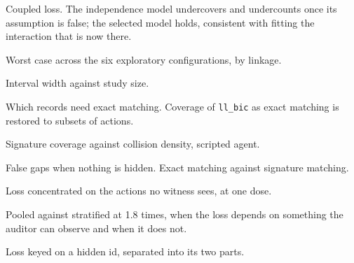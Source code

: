 \documentclass[11pt]{article}
\begin{document}
\begin{table}[h]
\centering

\caption{Coupled loss. The independence model undercovers and undercounts once its
assumption is false; the selected model holds, consistent with fitting the
interaction that is now there.}
\label{tab:coupling}
\end{table}

\begin{table}[h]
\centering

\caption{Worst case across the six exploratory configurations, by linkage.}
\label{tab:worst}
\end{table}

\begin{table}[h]
\centering

\caption{Interval width against study size.}
\label{tab:power}
\end{table}

\begin{table}[h]
\centering

\caption{Which records need exact matching. Coverage of \texttt{ll\_bic} as
exact matching is restored to subsets of actions.}
\label{tab:transfermech}
\end{table}

\begin{table}[h]
\centering

\caption{Signature coverage against collision density, scripted agent.}
\label{tab:transferdensity}
\end{table}

\begin{table}[h]
\centering

\caption{False gaps when nothing is hidden. Exact matching against signature
matching.}
\label{tab:falsepos}
\end{table}

\begin{table}[h]
\centering

\caption{Loss concentrated on the actions no witness sees, at one dose.}
\label{tab:mnar}
\end{table}

\begin{table}[h]
\centering

\caption{Pooled against stratified at 1.8 times, when the loss depends on
something the auditor can observe and when it does not.}
\label{tab:mnarstrat}
\end{table}

\begin{table}[h]
\centering

\caption{Loss keyed on a hidden id, separated into its two parts.}
\label{tab:hiddenkey}
\end{table}
\end{document}
